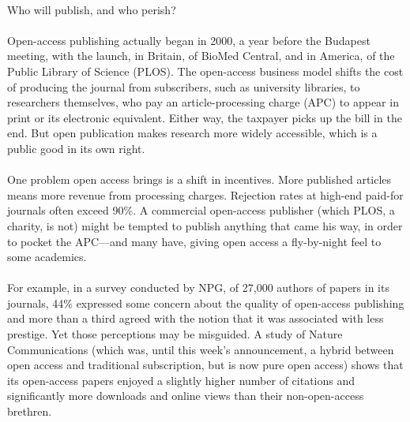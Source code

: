 \documentclass[a4paper, 12pt, UTF8]{article}
\begin{document}
\paragraph*{}
    \begin{bfseries}
        \large
        Who will publish, and who perish?
    \end{bfseries}

\paragraph*{}
    Open-access publishing actually began in 2000, a year before the Budapest meeting, with the launch, in Britain, of BioMed Central, and in America, of the Public Library of Science (PLOS). The open-access business model shifts the cost of producing the journal from subscribers, such as university libraries, to researchers themselves, who pay an article-processing charge (APC) to appear in print or its electronic equivalent. Either way, the taxpayer picks up the bill in the end. But open publication makes research more widely accessible, which is a public good in its own right.

\paragraph*{}
    One problem open access brings is a shift in incentives. More published articles means more revenue from processing charges. Rejection rates at high-end paid-for journals often exceed 90\%. A commercial open-access publisher (which PLOS, a charity, is not) might be tempted to publish anything that came his way, in order to pocket the APC—and many have, giving open access a fly-by-night feel to some academics.

\paragraph*{}
    For example, in a survey conducted by NPG, of 27,000 authors of papers in its journals, 44\% expressed some concern about the quality of open-access publishing and more than a third agreed with the notion that it was associated with less prestige. Yet those perceptions may be misguided. A study of Nature Communications (which was, until this week’s announcement, a hybrid between open access and traditional subscription, but is now pure open access) shows that its open-access papers enjoyed a slightly higher number of citations and significantly more downloads and online views than their non-open-access brethren.
\end{document}

